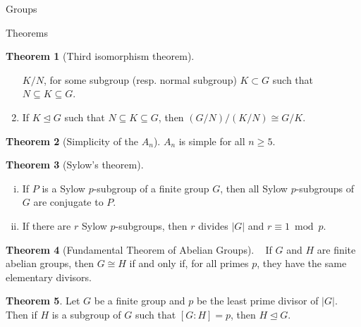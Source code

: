 \documentclass{article}
\theoremstyle{definition}
\newtheorem{theorem}{Theorem}
\numberwithin{theorem}{subsection} %
\theoremstyle{definition}
\begin{document}
\begin{section}{Groups}
\begin{subsection}{Theorems}
\begin{theorem}[Third isomorphism theorem]
\begin{enumerate}
        $K/N$, for some subgroup (resp. normal subgroup) $K \subset G$ such that
        $N \subseteq K \subseteq G$.
        \item If $K \trianglelefteq G$ such that $N \subseteq K \subseteq G$,
        then $(G/N)/(K/N) \cong G/K$.
      \end{enumerate}
    \end{theorem}
    \begin{theorem}[Simplicity of the $A_n$] %
      $A_n$ is simple for all $n \geq 5$.
    \end{theorem}
    \begin{theorem}[Sylow's theorem] ~ %
      \begin{enumerate}[(i)]
        \item If $P$ is a Sylow $p$-subgroup of a finite group $G$, then all
        Sylow $p$-subgroups of $G$ are conjugate to $P$.
        \item If there are $r$ Sylow $p$-subgroups, then $r$ divides $|G|$ and
        $r \equiv 1 \bmod p$.
      \end{enumerate}
    \end{theorem}
    \begin{theorem}[Fundamental Theorem of Abelian Groups] ~ %
      If $G$ and $H$ are finite abelian groups, then $G \cong H$ if and only if,
      for all primes $p$, they have the same elementary divisors.
    \end{theorem}
    \begin{theorem} %
      Let $G$ be a finite group and $p$ be the least prime divisor of $|G|$.
      Then if $H$ is a subgroup of $G$ such that $[G: H] = p$,
      then $H \trianglelefteq G$.
    \end{theorem}
  \end{subsection}
\end{section}
\pagebreak
%
%
\end{document}
